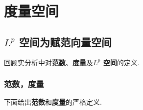 \ifx\allfiles\undefined


	\else
	\fi
\chapter{度量空间}

\section{$L^p$ 空间为赋范向量空间}
\begin{center}
	回顾实分析中对\textbf{范数}、\textbf{度量}及\textbf{$L^p$ 空间}的定义.
\end{center}
	
\subsection{范数，度量}
	下面给出\textbf{范数}和\textbf{度量}的严格定义.
